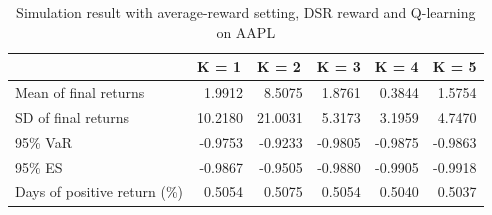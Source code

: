 \documentclass{article}
\begin{document}
\begin{table}[H]
\centering
\begin{tabular}{|l|r|r|r|r|r|} 
\hline
                             & \multicolumn{1}{l|}{K = 1} & \multicolumn{1}{l|}{K = 2} & \multicolumn{1}{l|}{K = 3} & \multicolumn{1}{l|}{K = 4} & \multicolumn{1}{l|}{K = 5}  \\ 
\hline
Mean of final returns        & 1.9912                     & 8.5075                     & 1.8761                     & 0.3844                     & 1.5754                      \\ 
\hline
SD of final returns          & 10.2180                    & 21.0031                    & 5.3173                     & 3.1959                     & 4.7470                      \\ 
\hline
95\% VaR                     & -0.9753                    & -0.9233                    & -0.9805                    & -0.9875                    & -0.9863                     \\ 
\hline
95\% ES                      & -0.9867                    & -0.9505                    & -0.9880                    & -0.9905                    & -0.9918                     \\ 
\hline
Days of positive return (\%) & 0.5054                     & 0.5075                     & 0.5054                     & 0.5040                     & 0.5037                      \\
\hline
\end{tabular}
\caption{Simulation result with average-reward setting, DSR reward and Q-learning on AAPL}
\label{table8}
\end{table}

\end{document}
